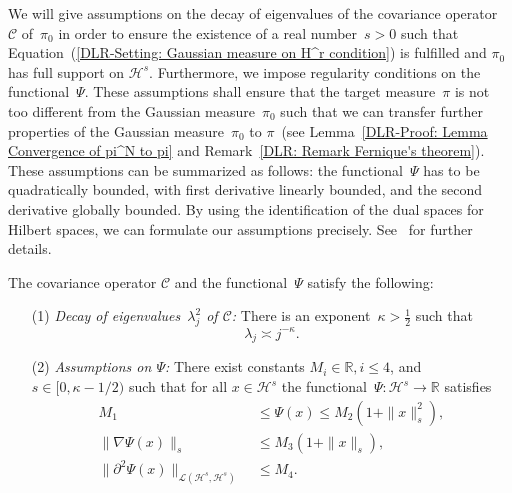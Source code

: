 We will give assumptions on the decay of eigenvalues of the covariance operator~$\mathcal{C}$ of~$\pi_0$ in order to ensure the existence of a real number~$s > 0$ such that Equation~(\ref{DLR-Setting: Gaussian measure on H^r condition}) is fulfilled and $\pi_0$ has full support on $\mathcal{H}^s$. Furthermore, we impose regularity conditions on the functional~$\Psi$. These assumptions shall ensure that the target measure~$\pi$ is not too different from the Gaussian measure~$\pi_0$ such that we can transfer further properties of the Gaussian measure~$\pi_0$ to $\pi$~(see Lemma~\ref{DLR-Proof: Lemma Convergence of pi^N to pi} and Remark~\ref{DLR: Remark Fernique's theorem}). These assumptions can be summarized as follows: the functional~$\Psi$ has to be quadratically bounded, with first derivative linearly bounded, and the second derivative globally bounded. By using the identification of the dual spaces for Hilbert spaces, we can formulate our assumptions precisely. See~\autocite[Assumption 2.1]{Pillai2012} for further details.

\begin{assum}
 \label{DLR-Setting: Assumptions on C and Psi}
 The covariance operator $\mathcal{C}$ and the functional~$\Psi$ satisfy the following:
 \begin{enumerate} 
  \item[(1)] \textit{Decay of eigenvalues~$\lambda_j^2$ of $\mathcal{C}$: } There is an exponent~$\kappa > \tfrac{1}{2}$ such that
 \begin{equation}
 \label{DLR-Seeting: Assumption on decay of eigenvalues}
  \lambda_j \asymp j^{- \kappa}.
 \end{equation}
 \item[(2)] \textit{Assumptions on $\Psi$: } There exist constants $M_i \in \mathbb{R}, i \leq 4$, and $s \in [0, \kappa - 1/2)$ such that for all $x \in \mathcal{H}^s$ the functional~$\Psi: \mathcal{H}^s \to \mathbb{R}$ satisfies
 \begin{align}
 \label{DLR-Setting: Assumption on Psi 1}
  M_1 & \; \leq \Psi(x) \leq M_2 (1+ \| x \|_s^2), \\
  \label{DLR-Setting: Assumption on Psi 2}
  \| \nabla \Psi (x) \|_{s} & \; \leq M_3 (1+\| x\|_s), \\
  \label{DLR-Setting: Assumption on Psi 3}
  \| \partial^2 \Psi (x) \|_{\mathcal{L}(\mathcal{H}^s, \mathcal{H}^{s})} & \; \leq M_4.
 \end{align}
 \end{enumerate}
\end{assum}

